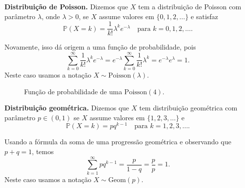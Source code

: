 \documentclass[12pt,portuguese]{article}
\theoremstyle{definition}
\begin{document}
\bigskip
\noindent\textbf{Distribuição de Poisson.} Dizemos que \(X\) tem a distribuição de
Poisson com parâmetro \(\lambda\), onde $\lambda>0$, se \(X\) assume valores em
\(\{0, 1, 2, \dots\}\) e satisfaz
\begin{equation}\label{eq:poisson}
  \mathbb{P}(X = k) = \frac{1}{k!} \lambda^k e^{-\lambda} \quad \text{para }
  k = 0, 1, 2, \dots.
\end{equation}

Novamente, isso dá origem a uma função de probabilidade, pois
\[
  \sum_{k=0}^{\infty} \frac{1}{k!} \lambda^k e^{-\lambda} = e^{-\lambda}
  \sum_{k=0}^{\infty} \frac{1}{k!} \lambda^k = e^{-\lambda} e^{\lambda} = 1.
\]
Neste caso usamos a notação $X\sim \mathrm{Poisson}(\lambda)$.

\begin{figure}[H]
\centering
{}
\caption{Função de probabilidade de uma $\mathrm{Poisson}(4)$.}
\label{fig:poisson-l4}
\end{figure}

\noindent\textbf{Distribuição geométrica.} Dizemos que \(X\) tem distribuição
geométrica com parâmetro \(p \in (0, 1)\) se \(X\) assume valores em
\(\{1, 2, 3, \dots\}\) e
\begin{equation}\label{eq:geometrica}
  \mathbb{P}(X = k) = p q^{k-1} \quad \text{para } k = 1, 2, 3, \dots.
\end{equation}

Usando a fórmula da soma de uma progressão geométrica e observando que
\(p+q=1\), temos
\[
  \sum_{k=1}^{\infty} p q^{k-1} = \frac{p}{1-q}  = \frac{p}{p} = 1.
\]
Neste caso usamos a notação $X\sim \mathrm{Geom}(p)$.
\end{document}
